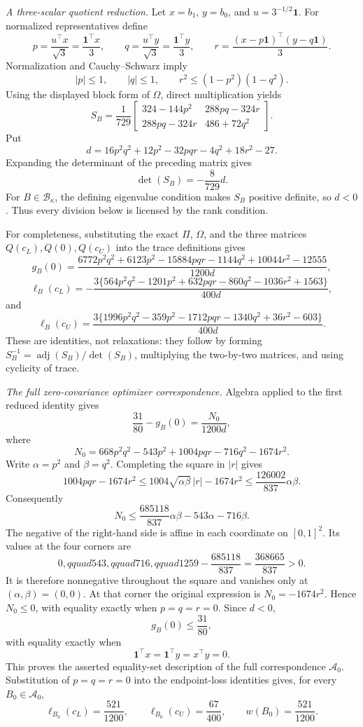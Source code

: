 \emph{A three-scalar quotient reduction.}
Let \(x=b_1\), \(y=b_0\), and \(u=3^{-1/2}\mathbf 1\).  For normalized representatives define
\[
p=\frac{u^{\top}x}{\sqrt3}=\frac{\mathbf 1^{\top}x}{3},
\qquad
q=\frac{u^{\top}y}{\sqrt3}=\frac{\mathbf 1^{\top}y}{3},
\qquad
r=\frac{(x-p\mathbf 1)^{\top}(y-q\mathbf 1)}{3}.
\]
Normalization and Cauchy--Schwarz imply
\[
|p|\le1,
\qquad |q|\le1,
\qquad
r^2\le(1-p^2)(1-q^2).
\]
Using the displayed block form of \(\Omega\), direct multiplication yields
\[
S_B=\frac1{729}
\begin{bmatrix}
324-144p^2&288pq-324r\\
288pq-324r&486+72q^2
\end{bmatrix}.
\]
Put
\[
d=16p^2q^2+12p^2-32pqr-4q^2+18r^2-27.
\]
Expanding the determinant of the preceding matrix gives
\[
\det(S_B)=-\frac8{729}d.
\]
For \(B\in\mathcal B_\kappa\), the defining eigenvalue condition makes \(S_B\) positive definite, so \(d<0\).  Thus every division below is licensed by the rank condition.

For completeness, substituting the exact \(\Pi\), \(\Omega\), and the three matrices \(Q(c_L),Q(0),Q(c_U)\) into the trace definitions gives
\[
g_B(0)=
\frac{6772p^2q^2+6123p^2-15884pqr-1144q^2+10044r^2-12555}
{1200d},
\]
\[
\ell_B(c_L)=
-\frac{3\{564p^2q^2-1201p^2+632pqr-860q^2-1036r^2+1563\}}
{400d},
\]
and
\[
\ell_B(c_U)=
\frac{3\{1996p^2q^2-359p^2-1712pqr-1340q^2+36r^2-603\}}
{400d}.
\]
These are identities, not relaxations: they follow by forming \(S_B^{-1}=\operatorname{adj}(S_B)/\det(S_B)\), multiplying the two-by-two matrices, and using cyclicity of trace.

\emph{The full zero-covariance optimizer correspondence.}
Algebra applied to the first reduced identity gives
\[
\frac{31}{80}-g_B(0)=\frac{N_0}{1200d},
\]
where
\[
N_0=668p^2q^2-543p^2+1004pqr-716q^2-1674r^2.
\]
Write \(\alpha=p^2\) and \(\beta=q^2\).  Completing the square in \(|r|\) gives
\[
1004pqr-1674r^2
\le1004\sqrt{\alpha\beta}\,|r|-1674r^2
\le\frac{126002}{837}\alpha\beta.
\]
Consequently
\[
N_0\le
\frac{685118}{837}\alpha\beta-543\alpha-716\beta.
\]
The negative of the right-hand side is affine in each coordinate on \([0,1]^2\).  Its values at the four corners are
\[
0,qquad 543,qquad716,qquad
1259-\frac{685118}{837}=\frac{368665}{837}>0.
\]
It is therefore nonnegative throughout the square and vanishes only at \((\alpha,\beta)=(0,0)\).  At that corner the original expression is \(N_0=-1674r^2\).  Hence \(N_0\le0\), with equality exactly when \(p=q=r=0\).  Since \(d<0\),
\[
g_B(0)\le\frac{31}{80},
\]
with equality exactly when
\[
\mathbf 1^{\top}x=\mathbf 1^{\top}y=x^{\top}y=0.
\]
This proves the asserted equality-set description of the full correspondence \(\mathcal A_0\).  Substitution of \(p=q=r=0\) into the endpoint-loss identities gives, for every \(B_0\in\mathcal A_0\),
\[
\ell_{B_0}(c_L)=\frac{521}{1200},
\qquad
\ell_{B_0}(c_U)=\frac{67}{400},
\qquad
w(B_0)=\frac{521}{1200}.
\]

